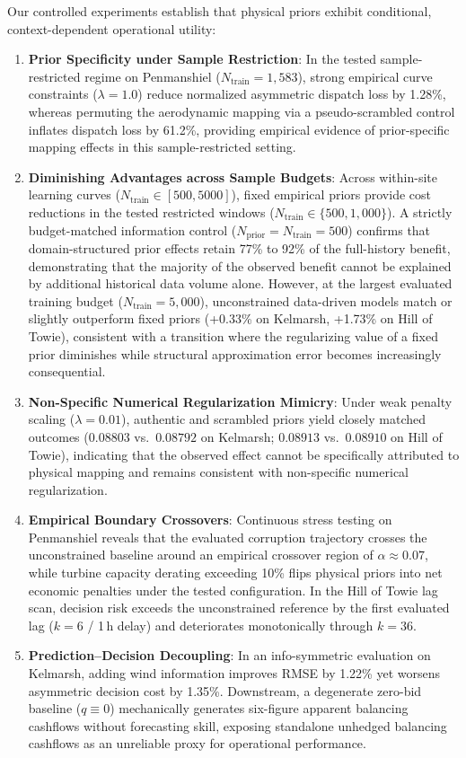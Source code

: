 Our controlled experiments establish that physical priors exhibit conditional, context-dependent operational utility:
\begin{enumerate}[leftmargin=*]
\item \textbf{Prior Specificity under Sample Restriction}: In the tested sample-restricted regime on Penmanshiel ($N_{\text{train}}=1{,}583$), strong empirical curve constraints ($\lambda=1.0$) reduce normalized asymmetric dispatch loss by 1.28\%, whereas permuting the aerodynamic mapping via a pseudo-scrambled control inflates dispatch loss by 61.2\%, providing empirical evidence of prior-specific mapping effects in this sample-restricted setting.
\item \textbf{Diminishing Advantages across Sample Budgets}: Across within-site learning curves ($N_{\text{train}} \in [500, 5000]$), fixed empirical priors provide cost reductions in the tested restricted windows ($N_{\text{train}} \in \{500, 1{,}000\}$). A strictly budget-matched information control ($N_{\text{prior}}=N_{\text{train}}=500$) confirms that domain-structured prior effects retain 77\% to 92\% of the full-history benefit, demonstrating that the majority of the observed benefit cannot be explained by additional historical data volume alone. However, at the largest evaluated training budget ($N_{\text{train}}=5{,}000$), unconstrained data-driven models match or slightly outperform fixed priors (+0.33\% on Kelmarsh, +1.73\% on Hill of Towie), consistent with a transition where the regularizing value of a fixed prior diminishes while structural approximation error becomes increasingly consequential.
\item \textbf{Non-Specific Numerical Regularization Mimicry}: Under weak penalty scaling ($\lambda=0.01$), authentic and scrambled priors yield closely matched outcomes ($0.08803$ vs.\ $0.08792$ on Kelmarsh; $0.08913$ vs.\ $0.08910$ on Hill of Towie), indicating that the observed effect cannot be specifically attributed to physical mapping and remains consistent with non-specific numerical regularization.
\item \textbf{Empirical Boundary Crossovers}: Continuous stress testing on Penmanshiel reveals that the evaluated corruption trajectory crosses the unconstrained baseline around an empirical crossover region of $\alpha \approx 0.07$, while turbine capacity derating exceeding 10\% flips physical priors into net economic penalties under the tested configuration. In the Hill of Towie lag scan, decision risk exceeds the unconstrained reference by the first evaluated lag ($k=6$ / 1\,h delay) and deteriorates monotonically through $k=36$.
\item \textbf{Prediction--Decision Decoupling}: In an info-symmetric evaluation on Kelmarsh, adding wind information improves RMSE by 1.22\% yet worsens asymmetric decision cost by 1.35\%. Downstream, a degenerate zero-bid baseline ($q \equiv 0$) mechanically generates six-figure apparent balancing cashflows without forecasting skill, exposing standalone unhedged balancing cashflows as an unreliable proxy for operational performance.
\end{enumerate}

